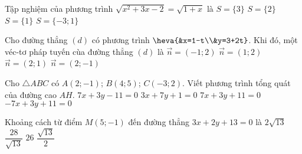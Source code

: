 \begin{ex}%
	Tập nghiệm của phương trình $\sqrt{x^2+3x-2}=\sqrt{1+x}$ là
	\choice
	{$S=\{3\}$}
	{$S=\{2\}$}
	{\True $S=\{1\}$}
	{$S=\{-3;1\}$}
\end{ex}

\begin{ex}%
	Cho đường thẳng $(d)$ có phương trình $\heva{&x=1-t\\&y=3+2t}$. Khi đó, một véc-tơ pháp tuyến cùa đường thẳng $(d)$ là
	\choice
	{$\overrightarrow{n}=(-1;2)$}
	{$\overrightarrow{n}=(1;2)$}
	{\True $\overrightarrow{n}=(2;1)$}
	{$\overrightarrow{n}=(2;-1)$}
\end{ex}

\begin{ex}%
	Cho $\triangle ABC$ có $A(2;-1)$; $B(4;5)$; $C(-3;2)$. Viết phương trình tổng quát của đường cao $AH$.
	\choice
	{\True $7x+3y-11=0 $}
	{$3x+7y+1=0$}
	{$7x+3y+11=0$}
	{$-7x+3y+11=0$}
\end{ex}

\begin{ex}%
	Khoảng cách từ điểm $M(5;-1)$ đến đường thẳng $3x + 2y +13 = 0$ là
	\choice
	{\True $2\sqrt{13}$}
	{$\dfrac{28}{\sqrt{13}}$}
	{$26$}
	{$\dfrac{\sqrt{13}}{2}$}
\end{ex}

